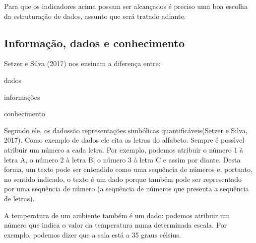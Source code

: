 \documentclass[
12pt,		%
openright,	%
twoside,  %
a4paper,			%
chapter=TITLE,		%
english,			%
french,				%
spanish,			%
brazil				%
]{USPSC-classe/USPSC}
\begin{document}
Para que os indicadores acima possam ser alcan\c{c}ados \'e preciso uma boa escolha da estrutura\c{c}\~ao de dados, assunto que ser\'a tratado adiante.














\subsection[Informa\c{c}\~ao, dados e conhecimento]{Informa\c{c}\~ao, dados e conhecimento}\label{Informa\c{c}\~ao, dados e conhecimento}
 Setzer e Silva (2017)  nos ensinam a diferen\c{c}a entre:















\begin{alineas}
\item dados
\item informa\c{c}\~oes
\item conhecimento
\end{alineas}

Segundo ele, os \textquotedbl dados\textquotedbl  s\~ao \textquotedbl representa\c{c}\~oes simb\'olicas quantific\'aveis\textquotedbl   (Setzer e Silva, 2017). Como exemplo de dados ele cita as letras do alfabeto. Sempre \'e poss\'{\i}vel atribuir um n\'umero a cada letra. Por exemplo, podemos atribuir o n\'umero 1 \`a letra A, o n\'umero 2 \`a letra B, o n\'umero 3 \`a letra C e assim por diante. Desta forma, um texto pode ser entendido como uma sequ\^encia de n\'umeros e, portanto, no sentido indicado, o texto \'e um dado porque tamb\'em pode ser representado por uma sequ\^encia de n\'umero (a sequ\^encia de n\'umeros que presenta a sequ\^encia de letras).














A temperatura de um ambiente tamb\'em \'e um dado: podemos atribuir um n\'umero que indica o valor da temperatura numa determinada escala. Por exemplo, podemos dizer que a sala \textquotedbl est\'a a 35 graus c\'elsius\textquotedbl .
\end{document}
